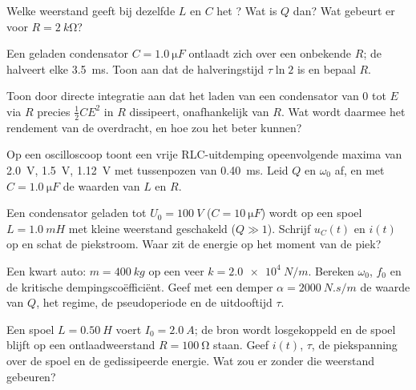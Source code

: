 \begin{exercise}[$\star$]\label{exo:b1:transient-regimes:4}
Welke weerstand geeft bij dezelfde $L$ en $C$ het ?
Wat is $Q$ dan? Wat gebeurt er voor $R = \qty{2}{k\ohm}$?
\end{exercise}

\begin{exercise}[$\star\star$]\label{exo:b1:transient-regimes:5}
Een geladen condensator $C = \qty{1.0}{\micro F}$ ontlaadt zich over een
onbekende $R$; de  halveert elke \qty{3.5}{ms}. Toon aan dat de
halveringstijd $\tau\ln 2$ is en bepaal $R$.
\end{exercise}

\begin{exercise}[$\star\star$]\label{exo:b1:transient-regimes:6}
Toon door directe integratie aan dat het laden van een condensator van $0$ tot $E$
via $R$ precies $\tfrac12 CE^2$ in $R$ dissipeert, onafhankelijk van
$R$. Wat wordt daarmee het rendement van de overdracht, en hoe zou het
beter kunnen?
\end{exercise}

\begin{exercise}[$\star\star$]\label{exo:b1:transient-regimes:7}
Op een oscilloscoop toont een vrije RLC-uitdemping opeenvolgende maxima van
\qty{2.0}{V}, \qty{1.5}{V}, \qty{1.12}{V} met tussenpozen van \qty{0.40}{ms}.
Leid $Q$ en $\omega_0$ af, en met $C = \qty{1.0}{\micro F}$ de waarden
van $L$ en $R$.
\end{exercise}

\begin{exercise}[$\star\star$]\label{exo:b1:transient-regimes:8}
Een condensator geladen tot $U_0 = \qty{100}{V}$ ($C = \qty{10}{\micro F}$) wordt
op een spoel $L = \qty{1.0}{mH}$ met kleine weerstand geschakeld ($Q \gg 1$).
Schrijf $u_C(t)$ en $i(t)$ op en schat de piekstroom. Waar zit
de energie op het moment van de piek?
\end{exercise}

\begin{exercise}[$\star\star$]\label{exo:b1:transient-regimes:9}
Een kwart auto: $m = \qty{400}{kg}$ op een veer $k = \qty{2.0e4}{N/m}$.
Bereken $\omega_0$, $f_0$ en de kritische dempingscoëfficiënt. Geef met een
demper $\alpha = \qty{2000}{N.s/m}$ de waarde van $Q$, het regime, de
pseudoperiode en de uitdooftijd $\tau$.
\end{exercise}

\begin{exercise}[$\star\star\star$]\label{exo:b1:transient-regimes:10}
Een spoel $L = \qty{0.50}{H}$ voert $I_0 = \qty{2.0}{A}$; de bron wordt
losgekoppeld en de spoel blijft op een ontlaadweerstand $R = \qty{100}{\ohm}$ staan.
Geef $i(t)$, $\tau$, de piekspanning over de spoel en de gedissipeerde
energie. Wat zou er zonder die weerstand gebeuren?
\end{exercise}

